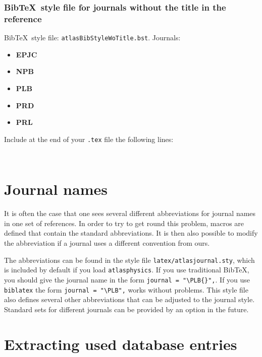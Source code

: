 \documentclass[UKenglish, texlive=2016]{\ATLASLATEXPATH atlasdoc}
\newcommand*{\BibTeX}{Bib\TeX}
\newcommand{\File}[1]{\texttt{#1}\xspace}
\newcommand{\Package}[1]{\texttt{#1}\xspace}
\begin{document}
\subsubsection{\BibTeX\ style file for journals without the title in the reference}

\BibTeX\ style file: \Package{atlasBibStyleWoTitle.bst}.
Journals:
\begin{itemize}\setlength{\parskip}{0pt}\setlength{\itemsep}{0pt}
\item \textbf{EPJC}
\item \textbf{NPB}
\item \textbf{PLB}
\item \textbf{PRD}
\item \textbf{PRL}
\end{itemize}
\noindent Include at the end of your \File{.tex} file the following lines:
\begin{verbatim}


\end{verbatim}


\section{Journal names}

It is often the case that one sees several different abbreviations for journal
names in one set of references.
In order to try to get round this problem, macros are defined that
contain the standard abbreviations.
It is then also possible to modify the abbreviation if a journal uses a different convention from ours.

The abbreviations can be found in the style file \File{latex/atlasjournal.sty},
which is included by default if you load \Package{atlasphysics}.
If you use traditional \BibTeX, you should give the journal name in the form
\verb|journal = "\PLB{}",|.
If you use \Package{biblatex} the form \verb|journal = "\PLB",| works without problems.
This style file also defines several other abbreviations that can be adjusted to the
journal style.
Standard sets for different journals can be provided by an option in the future.


\section{Extracting used database entries}
\label{sec:bibtool}
\end{document}
